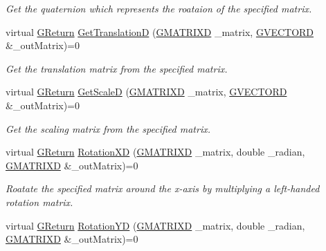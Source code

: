 \begin{DoxyCompactItemize}
\begin{DoxyCompactList}\small\item\em Get the quaternion which represents the roataion of the specified matrix. \end{DoxyCompactList}\item 
virtual \mbox{\hyperlink{namespaceGW_a67a839e3df7ea8a5c5686613a7a3de21}{G\+Return}} \mbox{\hyperlink{classGW_1_1MATH_1_1GMatrix_a2b2dd5bfce9dc5f567a793ab2a21bb07}{Get\+TranslationD}} (\mbox{\hyperlink{structGW_1_1MATH_1_1GMATRIXD}{G\+M\+A\+T\+R\+I\+XD}} \+\_\+matrix, \mbox{\hyperlink{structGW_1_1MATH_1_1GVECTORD}{G\+V\+E\+C\+T\+O\+RD}} \&\+\_\+out\+Matrix)=0
\begin{DoxyCompactList}\small\item\em Get the translation matrix from the specified matrix. \end{DoxyCompactList}\item 
virtual \mbox{\hyperlink{namespaceGW_a67a839e3df7ea8a5c5686613a7a3de21}{G\+Return}} \mbox{\hyperlink{classGW_1_1MATH_1_1GMatrix_a1d8d370c39617b8ad0fcfb42459fcb09}{Get\+ScaleD}} (\mbox{\hyperlink{structGW_1_1MATH_1_1GMATRIXD}{G\+M\+A\+T\+R\+I\+XD}} \+\_\+matrix, \mbox{\hyperlink{structGW_1_1MATH_1_1GVECTORD}{G\+V\+E\+C\+T\+O\+RD}} \&\+\_\+out\+Matrix)=0
\begin{DoxyCompactList}\small\item\em Get the scaling matrix from the specified matrix. \end{DoxyCompactList}\item 
virtual \mbox{\hyperlink{namespaceGW_a67a839e3df7ea8a5c5686613a7a3de21}{G\+Return}} \mbox{\hyperlink{classGW_1_1MATH_1_1GMatrix_abb2cbb56bb2f3963807e20ba0fe591b3}{Rotation\+XD}} (\mbox{\hyperlink{structGW_1_1MATH_1_1GMATRIXD}{G\+M\+A\+T\+R\+I\+XD}} \+\_\+matrix, double \+\_\+radian, \mbox{\hyperlink{structGW_1_1MATH_1_1GMATRIXD}{G\+M\+A\+T\+R\+I\+XD}} \&\+\_\+out\+Matrix)=0
\begin{DoxyCompactList}\small\item\em Roatate the specified matrix around the x-\/axis by multiplying a left-\/handed rotation matrix. \end{DoxyCompactList}\item 
virtual \mbox{\hyperlink{namespaceGW_a67a839e3df7ea8a5c5686613a7a3de21}{G\+Return}} \mbox{\hyperlink{classGW_1_1MATH_1_1GMatrix_a1f836790e81a0da00ad7e9e5b06969d4}{Rotation\+YD}} (\mbox{\hyperlink{structGW_1_1MATH_1_1GMATRIXD}{G\+M\+A\+T\+R\+I\+XD}} \+\_\+matrix, double \+\_\+radian, \mbox{\hyperlink{structGW_1_1MATH_1_1GMATRIXD}{G\+M\+A\+T\+R\+I\+XD}} \&\+\_\+out\+Matrix)=0

\end{DoxyCompactItemize}
